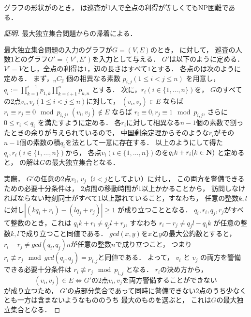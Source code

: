 \begin{theo}
  \label{theo:unit_exacidletime_NPhard}
  グラフの形状が{\graphUnit}のとき，
  {\timeSpecifiedPatProb}は巡査が1人で全点の利得が等しくてもNP困難である．
\end{theo}


\begin{proof}[証明]
  最大独立集合問題からの帰着による．

  最大独立集合問題の入力のグラフが$G = (V, E)$のとき，
  {\timeSpecifiedPatProb}に対して，
  巡査の人数$1$と{\graphUnit}のグラフ$G' = (V', E')$を入力として与える．
  $G'$は以下のように定める．
  $V' = V$とし，全点の利得は$1$，辺の長さはすべて$1$とする．
  各点の{\exactidletime}は次のように定める．
  まず，${}_n C_2$ 個の相異なる素数 $p_{i,j} (1 \leq i < j \leq n)$ を用意し，
  $q_i := \prod_{k = 1}^{i - 1} p_{1,k} \prod_{k = i + 1}^n p_{k,n}$
  とする．
  次に，$r_i (i \in \{1, \ldots, n\})$を，
  $G$のすべての2点$v_i, v_j (1 \leq i < j \leq n)$に対して，
  $(v_i, v_j) \in E$     ならば $r_i \equiv    r_j \equiv 0 \mod p_{i,j}$,
  $(v_i, v_j) \not\in E$ ならば $r_i \equiv 0, r_j \equiv 1 \mod p_{i,j}$,
  さらに$0 \leq r_i < q_i$
  を満たすように定める．
  各$r_i$に対して相異なる$n - 1$個の素数で割ったときの余りが与えられているので，
  中国剰余定理からそのような$r_i$がその$n - 1$個の素数の積$q_i$を法として一意に存在する．
  以上のようにして得た$q_i, r_i (i \in \{ 1, \ldots, n\})$から，
  各点$v_i (i \in \{1, \ldots, n\})$の{\exactidletime}を$q_i k + r_i (k \in \mathbf N)$
  と定めると，
  {\timeSpecifiedPatProb}の解は$G$の最大独立集合となる．

  実際，
  $G'$の任意の2点$v_i$, $v_j$（$i < j$としてよい）に対し，
  この両方を警備できるための必要十分条件は，
  2点間の移動時間が$1$以上かかることから，
  訪問しなければならない時刻同士がすべて$1$以上離れていること，すなわち，
  任意の整数$k, l$に対し$|(k q_i + r_i) - (l q_j + r_j)| \geq 1$
  が成り立つこととなる．
  $q_i, r_i, q_j, r_j$がすべて整数のとき，これは
  $q_i k + r_i \neq q_j l + r_j$, 
  すなわち
  $r_i - r_j \neq q_j l - q_i k$
  が任意の整数$k, l$で成り立つこと同値である．
  $gcd(x,y)$を$x$と$y$の最大公約数とすると，
  $r_i - r_j \neq gcd(q_i,q_j) n$が任意の整数$n$で成り立つこと，
  つまり$r_i \not\equiv r_j \mod gcd(q_i, q_j) = p_{i,j}$と同値である．
  よって，
  $v_i$ と $v_j$ の両方を警備できる必要十分条件は
  $r_i \not\equiv r_j \mod p_{i, j}$
  となる．
  $r_i$の決め方から，
  \[
    (v_i, v_j) \in E \iff \text{$G'$の2点$v_i, v_j$を両方警備することができない}
  \]
  が成り立つため，
  $G'$の点部分集合であって同時に警備できない2点のうち少なくとも一方は含まないようなもののうち
  最大のものを選ぶと，
  これは$G$の最大独立集合となる．


\end{proof}
